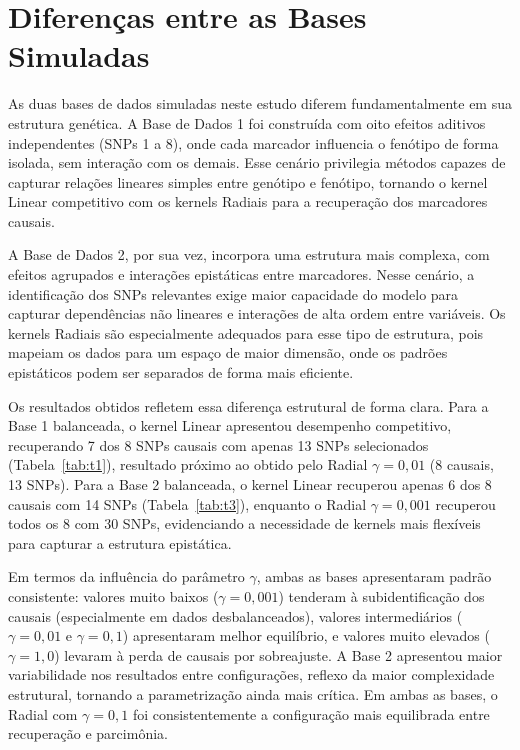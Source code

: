 \documentclass[12pt,a4paper]{article}
\newcommand{\novo}[1]{\textcolor{corNova}{#1}}
\begin{document}
\section{\novo{Diferenças entre as Bases Simuladas}}

\novo{As duas bases de dados simuladas neste estudo diferem fundamentalmente em sua estrutura genética. A Base de Dados 1 foi construída com oito efeitos aditivos independentes (SNPs 1 a 8), onde cada marcador influencia o fenótipo de forma isolada, sem interação com os demais. Esse cenário privilegia métodos capazes de capturar relações lineares simples entre genótipo e fenótipo, tornando o kernel Linear competitivo com os kernels Radiais para a recuperação dos marcadores causais.}

\novo{A Base de Dados 2, por sua vez, incorpora uma estrutura mais complexa, com efeitos agrupados e interações epistáticas entre marcadores. Nesse cenário, a identificação dos SNPs relevantes exige maior capacidade do modelo para capturar dependências não lineares e interações de alta ordem entre variáveis. Os kernels Radiais são especialmente adequados para esse tipo de estrutura, pois mapeiam os dados para um espaço de maior dimensão, onde os padrões epistáticos podem ser separados de forma mais eficiente.}

\novo{Os resultados obtidos refletem essa diferença estrutural de forma clara. Para a Base 1 balanceada, o kernel Linear apresentou desempenho competitivo, recuperando 7 dos 8 SNPs causais com apenas 13 SNPs selecionados (Tabela~\ref{tab:t1}), resultado próximo ao obtido pelo Radial $\gamma = 0{,}01$ (8 causais, 13 SNPs). Para a Base 2 balanceada, o kernel Linear recuperou apenas 6 dos 8 causais com 14 SNPs (Tabela~\ref{tab:t3}), enquanto o Radial $\gamma = 0{,}001$ recuperou todos os 8 com 30 SNPs, evidenciando a necessidade de kernels mais flexíveis para capturar a estrutura epistática.}

\novo{Em termos da influência do parâmetro $\gamma$, ambas as bases apresentaram padrão consistente: valores muito baixos ($\gamma = 0{,}001$) tenderam à subidentificação dos causais (especialmente em dados desbalanceados), valores intermediários ($\gamma = 0{,}01$ e $\gamma = 0{,}1$) apresentaram melhor equilíbrio, e valores muito elevados ($\gamma = 1{,}0$) levaram à perda de causais por sobreajuste. A Base 2 apresentou maior variabilidade nos resultados entre configurações, reflexo da maior complexidade estrutural, tornando a parametrização ainda mais crítica. Em ambas as bases, o Radial com $\gamma = 0{,}1$ foi consistentemente a configuração mais equilibrada entre recuperação e parcimônia.}
\end{document}
